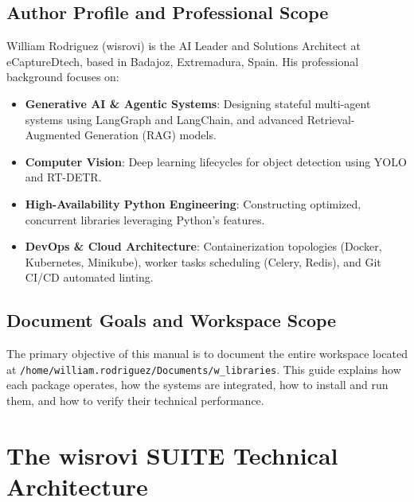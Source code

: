 \documentclass[12pt,a4paper]{report}
\begin{document}
\section{\sffamily Author Profile and Professional Scope}
William Rodriguez (wisrovi) is the AI Leader and Solutions Architect at eCaptureDtech, based in Badajoz, Extremadura, Spain. His professional background focuses on:
\begin{itemize}
    \item \textbf{Generative AI \& Agentic Systems}: Designing stateful multi-agent systems using LangGraph and LangChain, and advanced Retrieval-Augmented Generation (RAG) models.
    \item \textbf{Computer Vision}: Deep learning lifecycles for object detection using YOLO and RT-DETR.
    \item \textbf{High-Availability Python Engineering}: Constructing optimized, concurrent libraries leveraging Python's features.
    \item \textbf{DevOps \& Cloud Architecture}: Containerization topologies (Docker, Kubernetes, Minikube), worker tasks scheduling (Celery, Redis), and Git CI/CD automated linting.
\end{itemize}

\section{\sffamily Document Goals and Workspace Scope}
The primary objective of this manual is to document the entire workspace located at \texttt{/home/william.rodriguez/Documents/w\_libraries}. This guide explains how each package operates, how the systems are integrated, how to install and run them, and how to verify their technical performance.

\cleardoublepage
\chapter{The wisrovi SUITE Technical Architecture}
\end{document}
